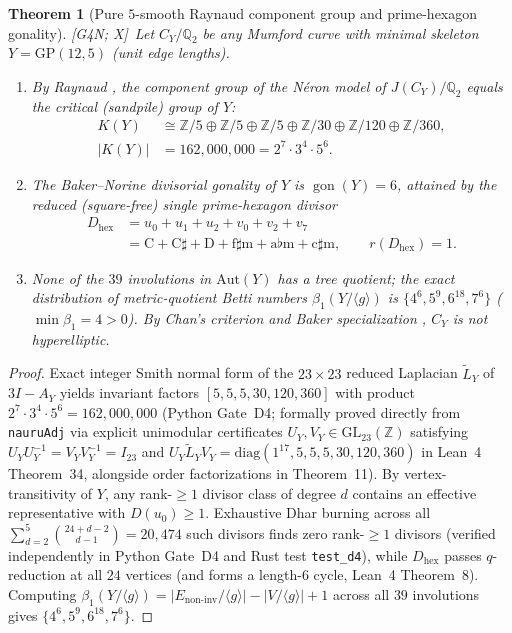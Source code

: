 \documentclass[11pt]{amsart}
\numberwithin{equation}{section}
\theoremstyle{plain}
\newtheorem{theorem}{Theorem}[section]
\theoremstyle{definition}\newtheorem{definition}[theorem]{Definition}
\theoremstyle{remark}\newtheorem{remark}[theorem]{Remark}
\newcommand{\Q}{\mathbb{Q}}
\newcommand{\Z}{\mathbb{Z}}
\newcommand{\Aut}{\mathrm{Aut}}
\newcommand{\GP}{\mathrm{GP}}
\newcommand{\ctag}[1]{\textup{\textsf{\scriptsize[#1]}}}
\begin{document}
\begin{theorem}[Pure $5$-smooth Raynaud component group and prime-hexagon gonality]\label{thm:tropical}
\ctag{G4N; X}\ Let $C_Y/\Q_2$ be any Mumford curve with minimal skeleton $Y=\GP(12,5)$ (unit edge lengths).
\begin{enumerate}[label=(\alph*),nosep]
\item By Raynaud \cite{raynaud1970}, the component group of the N\'eron model of $J(C_Y)/\Q_2$ equals the critical (sandpile) group of $Y$:
\begin{align*}
K(Y) &\cong \Z/5 \oplus \Z/5 \oplus \Z/5 \oplus \Z/30 \oplus \Z/120 \oplus \Z/360,\\
|K(Y)| &= 162{,}000{,}000 = 2^7\cdot 3^4\cdot 5^6.
\end{align*}
\item The Baker--Norine divisorial gonality \cite{bn2007} of $Y$ is $\operatorname{gon}(Y)=6$, attained by the reduced (square-free) single prime-hexagon divisor
\begin{align*}
D_{\mathrm{hex}} &= u_0 + u_1 + u_2 + v_0 + v_2 + v_7\\
&= \mathrm{C} + \mathrm{C}\sharp + \mathrm{D} + \mathrm{f}\sharp\mathrm{m} + \mathrm{a}\flat\mathrm{m} + \mathrm{c}\sharp\mathrm{m}, \qquad r(D_{\mathrm{hex}}) = 1.
\end{align*}
\item None of the $39$ involutions in $\Aut(Y)$ has a tree quotient; the exact distribution of metric-quotient Betti numbers $\beta_1(Y/\langle g\rangle)$ is $\{4^6, 5^9, 6^{18}, 7^6\}$ ($\min\beta_1=4>0$). By Chan's criterion \cite{chan2013} and Baker specialization \cite{baker2008}, $C_Y$ is not hyperelliptic.
\end{enumerate}
\end{theorem}
\begin{proof}
Exact integer Smith normal form of the $23\times 23$ reduced Laplacian $\tilde{L}_Y$ of $3I-A_Y$ yields invariant factors $[5,5,5,30,120,360]$ with product $2^7\cdot 3^4\cdot 5^6 = 162{,}000{,}000$ (Python Gate~D4; formally proved directly from \texttt{nauruAdj} via explicit unimodular certificates $U_Y, V_Y\in\mathrm{GL}_{23}(\Z)$ satisfying $U_Y U_Y^{-1}=V_Y V_Y^{-1}=I_{23}$ and $U_Y\tilde{L}_Y V_Y=\mathrm{diag}(1^{17},5,5,5,30,120,360)$ in Lean~4 Theorem~34, alongside order factorizations in Theorem~11). By vertex-transitivity of $Y$, any rank-$\ge 1$ divisor class of degree $d$ contains an effective representative with $D(u_0)\ge 1$. Exhaustive Dhar burning across all $\sum_{d=2}^5 \binom{24+d-2}{d-1} = 20{,}474$ such divisors finds zero rank-$\ge 1$ divisors (verified independently in Python Gate~D4 and Rust test \texttt{test\_d4}), while $D_{\mathrm{hex}}$ passes $q$-reduction at all $24$ vertices (and forms a length-$6$ cycle, Lean~4 Theorem~8). Computing $\beta_1(Y/\langle g\rangle)=|E_{\mathrm{non\text{-}inv}}/\langle g\rangle|-|V/\langle g\rangle|+1$ across all $39$ involutions gives $\{4^6,5^9,6^{18},7^6\}$.
\end{proof}
\end{document}
